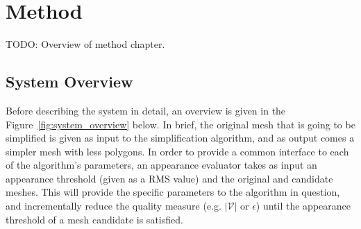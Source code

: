 
\chapter{Method} \label{cha:method}
TODO: Overview of method chapter.

\iffalse
\section{System Overview} \label{sec:system_overview}

Before describing the system in detail, an overview is given in the Figure~\ref{fig:system_overview} below. In brief, the original mesh that is going to be simplified is given as input to the simplification algorithm, and as output comes a simpler mesh with less polygons. In order to provide a common interface to each of the algorithm's parameters, an appearance evaluator takes as input an appearance threshold (given as a RMS value) and the original and candidate meshes. This will provide the specific parameters to the algorithm in question, and incrementally reduce the quality measure (e.g. $|\mathcal{V}|$ or $\epsilon$) until the appearance threshold of a mesh candidate is satisfied.

